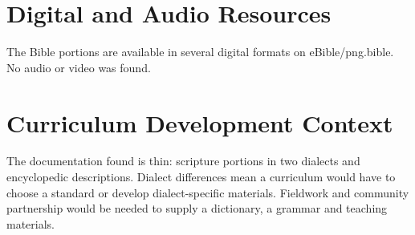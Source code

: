 \documentclass[12pt]{article}
\begin{document}
\section{Digital and Audio Resources}
The Bible portions are available in several digital formats on eBible/png.bible. No audio or video was found.

\section{Curriculum Development Context}
The documentation found is thin: scripture portions in two dialects and encyclopedic descriptions. Dialect differences mean a curriculum would have to choose a standard or develop dialect-specific materials. Fieldwork and community partnership would be needed to supply a dictionary, a grammar and teaching materials.
\end{document}

